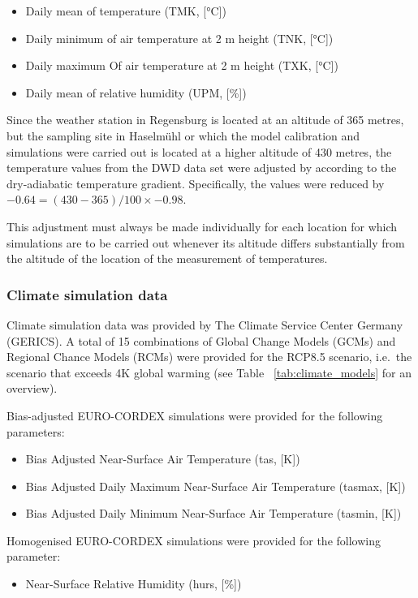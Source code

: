 \documentclass[a4paper, 11pt]{scrartcl}
\begin{document}
\begin{itemize}[noitemsep]
	\item Daily mean of temperature (TMK, [°C])
	\item Daily minimum of air temperature at 2 m height (TNK, [°C])
	\item Daily maximum Of air temperature at 2 m height (TXK, [°C])
	\item Daily mean of relative humidity (UPM, [\%])
\end{itemize}

Since the weather station in Regensburg is located at an altitude of 365 metres, but the sampling site in Haselmühl or which the model calibration and simulations were carried out is located at a higher altitude of 430 metres, the temperature values from the DWD data set were adjusted by according to the dry-adiabatic temperature gradient. Specifically, the values were reduced by $-0.64 = (430 - 365) / 100 \times -0.98$.

This adjustment must always be made individually for each location for which simulations are to be carried out whenever its altitude differs substantially from the altitude of the location of the measurement of temperatures.

\subsubsection{Climate simulation data}
Climate simulation data was provided by The Climate Service Center Germany (GERICS). A total of 15 combinations of Global Change Models (GCMs) and Regional Chance Models (RCMs) were provided for the RCP8.5 scenario, i.e.\ the scenario that exceeds 4K global warming (see Table ~\ref{tab:climate_models} for an overview).

Bias-adjusted EURO-CORDEX simulations were provided for the following parameters:
\begin{itemize}[noitemsep]
\item Bias Adjusted Near-Surface Air Temperature (tas, [K])
\item Bias Adjusted Daily Maximum Near-Surface Air Temperature (tasmax, [K])
\item Bias Adjusted Daily Minimum Near-Surface Air Temperature (tasmin, [K])
\end{itemize}

Homogenised EURO-CORDEX simulations were provided for the following parameter:
\begin{itemize}
\item Near-Surface Relative Humidity (hurs, [\%])
\end{itemize}
\end{document}
